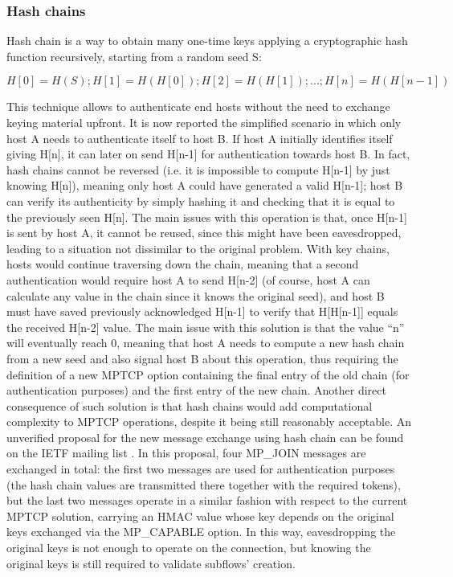 \subsubsection{Hash chains}
Hash chain is a way to obtain many one-time keys applying a cryptographic hash function recursively, starting from a random seed S:
  
  \[H[0] = H(S); H[1] = H(H[0]); H[2] = H(H[1]); ...; H[n] = H(H[n-1])\]
  
This technique allows to authenticate end hosts without the need to exchange keying material upfront. It is now reported the simplified scenario in which only host A needs to authenticate itself to host B. If host A initially identifies itself giving H[n], it can later on send H[n-1] for authentication towards host B. In fact, hash chains cannot be reversed (i.e. it is impossible to compute H[n-1] by just knowing H[n]), meaning only host A could have generated a valid H[n-1]; host B can verify its authenticity by simply hashing it and checking that it is equal to the previously seen H[n].
  The main issues with this operation is that, once H[n-1] is sent by host A, it cannot be reused, since this might have been eavesdropped, leading to a situation not dissimilar to the original problem. With key chains, hosts would continue traversing down the chain, meaning that a second authentication would require host A to send H[n-2] (of course, host A can calculate any value in the chain since it knows the original seed), and host B must have saved previously acknowledged H[n-1] to verify that H[H[n-1]] equals the received H[n-2] value.
  The main issue with this solution is that the value ``n'' will eventually reach 0, meaning that host A needs to compute a new hash chain from a new seed and also signal host B about this operation, thus requiring the definition of a new MPTCP option containing the final entry of the old chain (for authentication purposes) and the first entry of the new chain.
  Another direct consequence of such solution is that hash chains would add computational complexity to MPTCP operations, despite it being still reasonably acceptable.
  An unverified proposal for the new message exchange using hash chain can be found on the IETF mailing list \cite{hashchain}.
In this proposal, four MP\_JOIN messages are exchanged in total: the first two messages are used for authentication purposes (the hash chain values are transmitted there together with the required tokens), but the last two messages operate in a similar fashion with respect to the current MPTCP solution, carrying an HMAC value whose key depends on the original keys exchanged via the MP\_CAPABLE option. In this way, eavesdropping the original keys is not enough to operate on the connection, but knowing the original keys is still required to validate subflows' creation.


